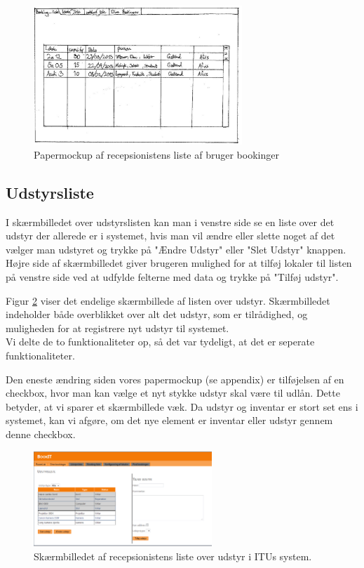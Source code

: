 \begin{figure}[h!]
  \centering
    \includegraphics[width=0.7\textwidth]{Appendix/GUI-Prototype/PaperMockup/GodkendBookinger_001}
  \caption{Papermockup af recepsionistens liste af bruger bookinger}
\label{Design_G_Development_BookingListe}
\end{figure} 

\subsection{Udstyrsliste}
I skærmbilledet over udstyrslisten kan man i venstre side se en liste over det udstyr der allerede er i systemet, hvis man vil ændre eller slette noget af det vælger man udstyret og trykke på "Ændre Udstyr" eller "Slet Udstyr" knappen. Højre side af skærmbilledet giver brugeren mulighed for at tilføj lokaler til listen på venstre side ved at udfylde felterne med data og trykke på "Tilføj udstyr".

Figur \ref{Design_G_Development_UdstyrsListe_Final} viser det endelige skærmbillede af listen over udstyr.
Skærmbilledet indeholder både overblikket over alt det udstyr, som er tilrådighed, og muligheden for at registrere nyt udstyr til systemet.
\\Vi delte de to funktionaliteter op, så det var tydeligt, at det er seperate funktionaliteter.

Den eneste ændring siden vores papermockup (se appendix) er tilføjelsen af en checkbox, hvor man kan vælge et nyt stykke udstyr skal være til udlån. Dette betyder, at vi sparer et skærmbillede væk. Da udstyr og inventar er stort set ens i systemet, kan vi afgøre, om det nye element er inventar eller udstyr gennem denne checkbox.

\begin{figure}[h!]
  \centering
    \includegraphics[width=0.6\textwidth]{Appendix/GUI-Prototype/DigitalMockup/UdstyrsListe}
  \caption{Skærmbilledet af recepsionistens liste over udstyr i ITUs system.}
\label{Design_G_Development_UdstyrsListe_Final}
\end{figure} 

